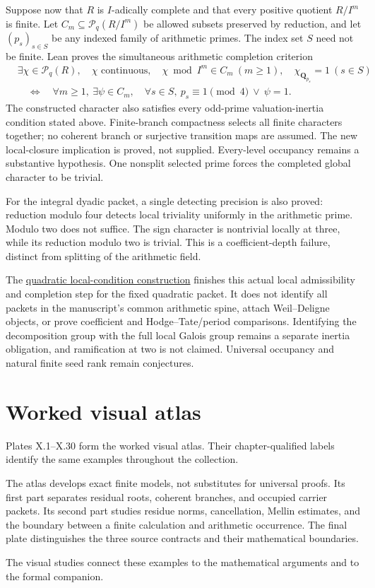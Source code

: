 \documentclass[11pt]{article}
\theoremstyle{definition}
\theoremstyle{remark}
\newcommand{\Q}{\mathbf Q}
\begin{document}
Suppose now that $R$ is $I$-adically complete and that every positive
quotient $R/I^m$ is finite. Let $C_m\subseteq\mathcal P_q(R/I^m)$ be
allowed subsets preserved by reduction, and let $(p_s)_{s\in S}$ be any
indexed family of arithmetic primes. The index set $S$ need not be finite.
Lean proves the simultaneous arithmetic completion criterion
\[
\begin{split}
&\exists\chi\in\mathcal P_q(R),\quad
 \chi\text{ continuous},\quad
 \chi\bmod I^m\in C_m\ (m\ge1),\quad
 \chi_{\Q_{p_s}}=1\ (s\in S)\\
&\quad\Longleftrightarrow\quad
 \forall m\ge1,\ \exists\psi\in C_m,\quad
 \forall s\in S,\ p_s\equiv1\pmod4\ \lor\ \psi=1.
\end{split}
\]
The constructed character also satisfies every odd-prime valuation-inertia
condition stated above. Finite-branch compactness selects all finite
characters together; no coherent branch or surjective transition maps
are assumed. The new local-closure implication is proved, not supplied.
Every-level occupancy remains a substantive hypothesis. One nonsplit
selected prime forces the completed global character to be trivial.

For the integral dyadic packet, a single detecting precision is also
proved: reduction modulo four detects local triviality uniformly in the
arithmetic prime. Modulo two does not suffice. The sign character is
nontrivial locally at three, while its reduction modulo two is trivial.
This is a coefficient-depth failure, distinct from splitting of the
arithmetic field.

The \hyperref[book:x-construction-22]{quadratic local-condition construction} finishes this actual local admissibility and completion step for
the fixed quadratic packet. It does not identify all packets in the
manuscript's common arithmetic spine, attach Weil--Deligne objects, or
prove coefficient and Hodge--Tate/period comparisons. Identifying the decomposition group
with the full local Galois group remains a separate inertia
obligation, and ramification at two is not claimed. Universal occupancy and natural finite seed rank remain conjectures.



\clearpage
{}
{}

\clearpage
\section{Worked visual atlas}\label{sec:atlas}
Plates X.1--X.30 form the worked visual atlas. Their chapter-qualified
labels identify the same examples throughout the collection.

The atlas develops exact finite models, not substitutes for universal proofs.
Its first part separates residual roots, coherent branches, and occupied carrier
packets. Its second part studies residue norms, cancellation, Mellin estimates,
and the boundary between a finite calculation and arithmetic occurrence.
The final plate distinguishes the three source contracts and their
mathematical boundaries.

The visual studies connect these examples to the mathematical arguments
and to the formal companion.
\end{document}
